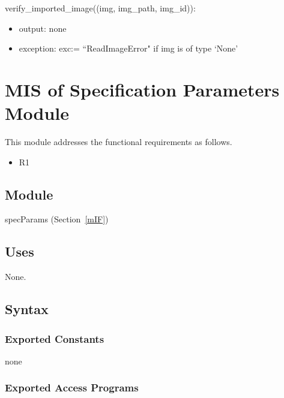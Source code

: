 \documentclass[12pt, titlepage]{article}
\begin{document}
\noindent verify\_imported\_image((img, img\_path, img\_id)):
\begin{itemize}
  \item output: none
  \item exception: exc:= ``ReadImageError" if img is of type `None'
\end{itemize}


\newpage
\section{MIS of Specification Parameters Module} \label{mSP}
This module addresses the functional requirements as follows.
\begin{itemize}
  \item R1
\end{itemize}

\subsection{Module}
specParams (Section~\ref{mIF})

\subsection{Uses}
None.

\subsection{Syntax}

\subsubsection{Exported Constants}
none
\subsubsection{Exported Access Programs}
\end{document}
